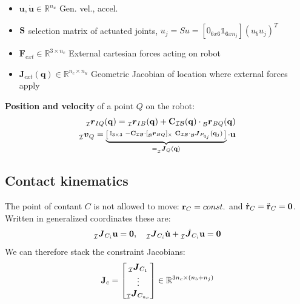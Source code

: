 \documentclass[a4paper, 8pt]{extarticle}
\newcommand{\mvec}[3]{  \prescript{}{\mathcal{#1}}{\bm{#2}}  _{#3} }
\newcommand{\mdvec}[3]{ \prescript{}{\mathcal{#1}}{\dot{\bm #2}} _{#3} }
\newcommand{\mrot}[2]{ \textbf{#1}_{ \mathcal{#2} } }
\begin{document}
\begin{multicols*}{3}
\begin{itemize}
\item $\mathbf{u,\dot u} \in \mathbb{R}^{n_u}$ Gen. vel., accel.
\item $\bf S$ selection matrix of actuated joints, $u_{j}=Su=[0_{6x6} \mathbb{1}_{6xn_{j}}](u_{b} u_{j})^T$
\item $\mathbf{F}_{ext} \in \mathbb{R}^{3\times n_c}$ External cartesian forces acting on robot
\item $\mathbf J_{ext}(\mathbf q) \in \mathbb R^{n_c\times n_u}$ Geometric Jacobian of location where external forces apply
\end{itemize}
\noindent \textbf{Position and velocity} of a point $Q$ on the robot: 
\begin{align*}
\mvec{I}{r}{IQ}({\bf q}) = \mvec{I}{r}{IB}({\bf q}) + \mrot{C}{IB}({\bf q}) \cdot \mvec{B}{r}{BQ}({\bf q})\\
\mvec{I}{v}{Q} = \underbrace{\left[\begin{smallmatrix} \mathbb{I}_{3\times 3} & -\mrot{C}{IB} \cdot [\mvec{B}{r}{BQ}]_{\times} & \mrot{C}{IB} \cdot \mvec{B}{J}{P_{q_j}}({\bf q}_j) \end{smallmatrix}\right]}_{ = \mvec{I}{J}{Q}({\bf q})}\cdot {\bf u}
\end{align*}


\subsection{Contact kinematics}
The point of contant $C$ is not allowed to move: ${\bf r}_C = const.$ and $\dot{\bf r}_C = \ddot{\bf r}_C = \bm 0$. Written in generalized coordinates these are:
$$\mvec{I}{J}{C_i}{\bf u} = \bm 0, \quad \mvec{I}{J}{C_i}\dot{\bf u} + \mdvec{I}{J}{C_i}{\bf u} = \bm 0$$
We can therefore stack the constraint Jacobians:
$${\bf J}_c = \begin{bmatrix}
\mvec{I}{J}{C_1} \\
\vdots \\
\mvec{I}{J}{C_{n_c}}
\end{bmatrix}
\in \mathbb{R}^{3n_c \times (n_b + n_j)}
$$


\end{multicols*}
\end{document}
